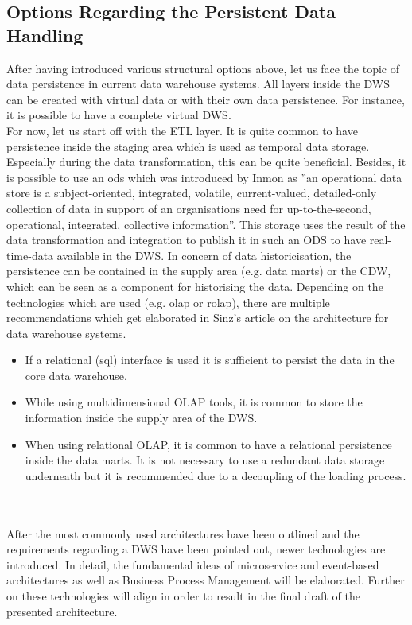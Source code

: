 \subsection{Options Regarding the Persistent Data Handling}
\label{sec:dataHandling}
After having introduced various structural options above, let us face the topic of data persistence in current data warehouse systems.
All layers inside the DWS can be created with virtual data or with their own data persistence. For instance, it is possible to have a complete virtual DWS. \cite{sinz}\newline
\\
For now, let us start off with the ETL layer. It is quite common to have persistence inside the staging area which is used as temporal data storage. Especially during the data transformation, this can be quite beneficial. Besides, it is possible to use an \acrfull{ods} which was introduced by Inmon as ''an operational data store is a subject-oriented, integrated, volatile, current-valued, detailed-only collection of data in support of an organisations need for up-to-the-second, operational, integrated, collective information''. \cite{buildingTheDWS} This storage uses the result of the data transformation and integration to publish it in such an ODS to have real-time-data available in the DWS.\newline
In concern of data historicisation, the persistence can be contained in the supply area (e.g. data marts) or the CDW, which can be seen as a component for historising the data. Depending on the technologies which are used (e.g. \acrshort{olap} or \acrshort{rolap}), there are multiple recommendations which get elaborated in Sinz's article on the architecture for data warehouse systems.
\begin{itemize}
    \item If a relational (\acrshort{sql}) interface is used it is sufficient to persist the data in the core data warehouse.
    \item While using multidimensional OLAP tools, it is common to store the information inside the supply area of the DWS.
    \item When using relational OLAP, it is common to have a relational persistence inside the data marts. It is not necessary to use a redundant data storage underneath but it is recommended due to a decoupling of the loading process. 
\end{itemize}
\cite{sinz}
\\
\\
After the most commonly used architectures have been outlined and the requirements regarding a DWS have been pointed out, newer technologies are introduced. In detail, the fundamental ideas of microservice and event-based architectures as well as Business Process Management will be elaborated. Further on these technologies will align in order to result in the final draft of the presented architecture.